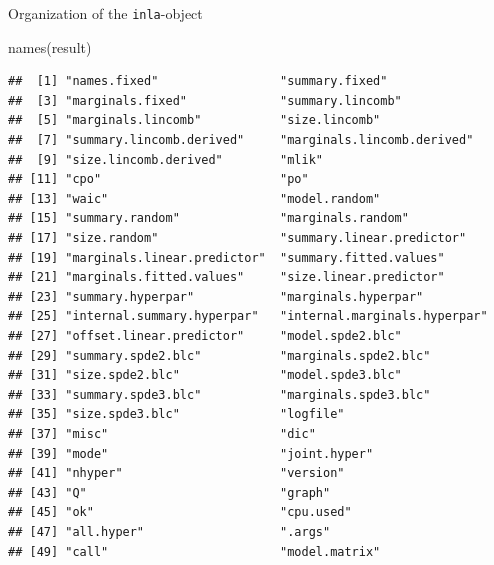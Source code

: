 \documentclass[
  handout]{beamer}
\newenvironment{Shaded}{\begin{snugshade}}{\end{snugshade}}
\newcommand{\FunctionTok}[1]{\textcolor[rgb]{0.00,0.00,0.00}{#1}}
\newcommand{\NormalTok}[1]{#1}
\begin{document}
\begin{frame}[fragile]{Organization of the \texttt{inla}-object}
\protect\hypertarget{organization-of-the-inla-object}{}
\tiny

\begin{Shaded}
\begin{Highlighting}[]
\FunctionTok{names}\NormalTok{(result)}
\end{Highlighting}
\end{Shaded}

\begin{verbatim}
##  [1] "names.fixed"                 "summary.fixed"              
##  [3] "marginals.fixed"             "summary.lincomb"            
##  [5] "marginals.lincomb"           "size.lincomb"               
##  [7] "summary.lincomb.derived"     "marginals.lincomb.derived"  
##  [9] "size.lincomb.derived"        "mlik"                       
## [11] "cpo"                         "po"                         
## [13] "waic"                        "model.random"               
## [15] "summary.random"              "marginals.random"           
## [17] "size.random"                 "summary.linear.predictor"   
## [19] "marginals.linear.predictor"  "summary.fitted.values"      
## [21] "marginals.fitted.values"     "size.linear.predictor"      
## [23] "summary.hyperpar"            "marginals.hyperpar"         
## [25] "internal.summary.hyperpar"   "internal.marginals.hyperpar"
## [27] "offset.linear.predictor"     "model.spde2.blc"            
## [29] "summary.spde2.blc"           "marginals.spde2.blc"        
## [31] "size.spde2.blc"              "model.spde3.blc"            
## [33] "summary.spde3.blc"           "marginals.spde3.blc"        
## [35] "size.spde3.blc"              "logfile"                    
## [37] "misc"                        "dic"                        
## [39] "mode"                        "joint.hyper"                
## [41] "nhyper"                      "version"                    
## [43] "Q"                           "graph"                      
## [45] "ok"                          "cpu.used"                   
## [47] "all.hyper"                   ".args"                      
## [49] "call"                        "model.matrix"
\end{verbatim}

\normalsize
\end{frame}
\end{document}
